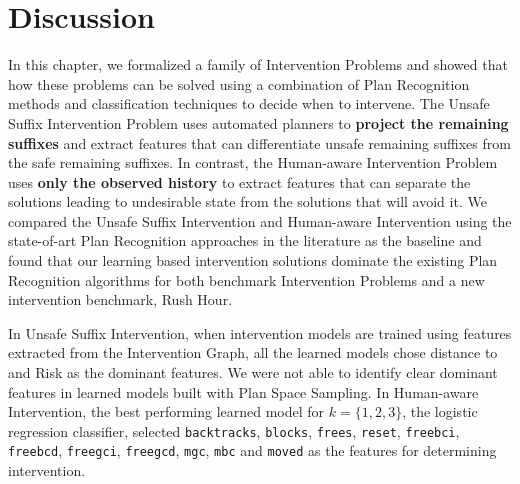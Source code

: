 \section{Discussion}
\label{sec:discussion}
In this chapter, we formalized a family of Intervention Problems and showed that how these problems can be solved using a combination of Plan Recognition methods and classification techniques to decide when to intervene.
The Unsafe Suffix Intervention Problem uses automated planners to \textbf{project the remaining suffixes} and extract features that can differentiate unsafe remaining suffixes from the safe remaining suffixes. 
In contrast, the Human-aware Intervention Problem uses \textbf{only the observed history \historyDef} to extract features that can separate the solutions leading to undesirable state from the solutions that will avoid it.
We compared the Unsafe Suffix Intervention and Human-aware Intervention using the state-of-art Plan Recognition approaches in the literature as the baseline and found that our learning based intervention solutions dominate the existing Plan Recognition algorithms for both benchmark Intervention Problems and a new intervention benchmark, Rush Hour.

In Unsafe Suffix Intervention, when intervention models are trained using features extracted from the Intervention Graph, all the learned models chose distance to \undesired and Risk as the dominant features. We were not able to identify clear dominant features in learned models built with Plan Space Sampling. 
In Human-aware Intervention, the best performing learned model for $k=\lbrace 1,2,3\rbrace$, the logistic regression classifier, selected  \texttt{backtracks}, \texttt{blocks}, \texttt{frees}, \texttt{reset}, \texttt{freebci}, \texttt{freebcd}, \texttt{freegci}, \texttt{freegcd}, \texttt{mgc}, \texttt{mbc} and \texttt{moved} as the features for determining intervention.

